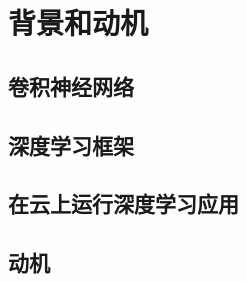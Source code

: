 \chapter{背景和动机}
\label{cha:back}

\section{卷积神经网络}
\label{sec:CNN}

\section{深度学习框架}
\label{sec:DNNframework}

\section{在云上运行深度学习应用}
\label{sec:cloud}

\section{动机}
\label{sec:motivation}

